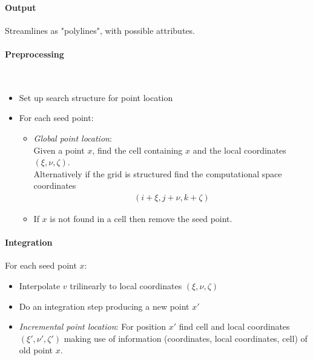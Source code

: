 \paragraph{Output} Streamlines as "polylines", with possible attributes.

\paragraph{Preprocessing} $\ $
\begin{itemize}
    \item Set up search structure for point location
    \item For each seed point:
        \begin{itemize}
            \item \emph{Global point location}: \\ Given a point $x$, find the cell containing $x$ and the local coordinates $(\xi, \nu, \zeta)$. \\
            Alternatively if the grid is structured find the computational space coordinates
            \begin{align*}    
                (i+\xi, j+\nu, k+\zeta)
            \end{align*}
            \item If $x$ is not found in a cell then remove the seed point.
        \end{itemize}
        
\end{itemize}
\paragraph{Integration} For each seed point $x$:
\begin{itemize}
\item Interpolate $v$ trilinearly to local coordinates $(\xi, \nu, \zeta)$
\item Do an integration step producing a new point $x'$
\item \emph{Incremental point location}: For position $x'$ find cell and local coordinates $(\xi', \nu', \zeta')$ making use of information (coordinates, local coordinates, cell) of old point $x$.
\end{itemize}
